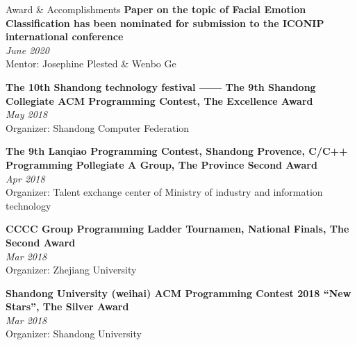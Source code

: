 \documentclass{resume} %
\begin{document}
\begin{rSection}{Award \& Accomplish­ments}
{\bf Paper on the topic of Facial Emotion Classification has been nominated for submission to the ICONIP  international conference}\\ \hfill {\em June 2020}\\
{Mentor: Josephine Plested \& Wenbo Ge}
 
{\bf The 10th Shandong technology festival —— The 9th Shandong Collegiate ACM Programming Contest, The Excellence Award}\\ \hfill {\em May 2018}\\
{Organizer: Shandong Computer Federation}

{\bf The 9th Lanqiao Programming Contest, Shandong Provence, C/C++ Programming Pollegiate A Group, The Province Second Award}\\ \hfill {\em Apr 2018}\\
{Organizer: Talent exchange center of Ministry of industry and information technology}

{\bf CCCC Group Programming Ladder Tournamen, National Finals, The Second Award}\\ \hfill {\em Mar 2018}\\
{Organizer: Zhejiang University}

{\bf Shandong University (weihai) ACM Programming Contest 2018 “New Stars”, The Silver Award}\\ \hfill {\em Mar 2018}\\
{Organizer: Shandong University}

\end{rSection}




\end{document}
